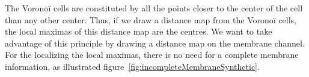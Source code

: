 The Voronoï cells are constituted by all the points closer to the center of the cell than any other center. Thus, if we draw a distance map from the Voronoï cells, the local maximas of this distance map are the centres.
We want to take advantage of this principle by drawing a distance map on the membrane channel. For the localizing the local maximas, there is no need for a complete membrane information, as illustrated figure~\ref{fig:incompleteMembraneSynthetic}.
\begin{figure}[h]
  \centering
{}
\\

\end{figure}
